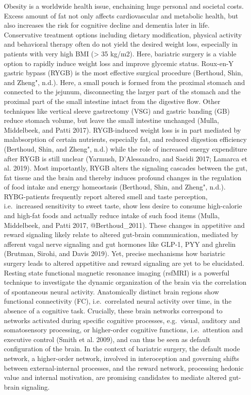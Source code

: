 \documentclass[
]{article}
\begin{document}
Obesity is a worldwide health issue, enchaining huge personal and societal costs. Excess amount of fat not only affects cardiovascular and metabolic health, but also increases the risk for cognitive decline and dementia later in life.
Conservative treatment options including dietary modification, physical activity and behavioral therapy often do not yield the desired weight loss, especially in patients with very high BMI (\textgreater{} 35 kg/m2). Here, bariatric surgery is a viable option to rapidly induce weight loss and improve glycemic status.
Roux-en-Y gastric bypass (RYGB) is the most effective surgical procedure (Berthoud, Shin, and Zheng", n.d.). Here, a small pouch is formed from the proximal stomach and connected to the jejunum, disconnecting the larger part of the stomach and the proximal part of the small intestine intact from the digestive flow. Other techniques like vertical sleeve gastrectomy (VSG) and gastric banding (GB) reduce stomach volume, but leave the small intestine unchanged (Mulla, Middelbeek, and Patti 2017).
RYGB-induced weight loss is in part mediated by malabsorption of certain nutrients, especially fat, and reduced digestion efficiency (Berthoud, Shin, and Zheng", n.d.) while the role of increased energy expenditure after RYGB is still unclear (Yarmush, D'Alessandro, and Saeidi 2017; Lamarca et al. 2019). Most importantly, RYGB alters the signaling cascades between the gut, fat tissue and the brain and thereby induces profound changes in the regulation of food intake and energy homeostasis (Berthoud, Shin, and Zheng", n.d.). RYBG-patients frequently report altered smell and taste perception, i.e.~increased sensitivity to sweet taste, show less desire to consume high-calorie and high-fat foods and actually reduce intake of such food items (Mulla, Middelbeek, and Patti 2017, @Berthoud\_2011). These changes in appetitive and reward signaling likely relate to altered gut-brain communication, mediated by afferent vagal nerve signaling and gut hormones like GLP-1, PYY and ghrelin (Brutman, Sirohi, and Davis 2019).
Yet, precise mechanisms how bariatric surgery leads to altered appetitive and reward signaling are yet to be elucidated.
Resting state functional magnetic resonance imaging (rsfMRI) is a powerful technique to investigate the dynamic organization of the brain via the correlation of spontaneous neural activity. Anatomically distinct brain regions show functional connectivity (FC), i.e.~correlated neural activity over time, in the absence of a cognitive task. Crucially, these brain networks correspond to networks activated during specific cognitive processes, e.g.~visual, auditory and somatosensory processing, or higher-order cognitive functions, i.e.~attention and executive control (Smith et al. 2009), and can thus be seen as default configuration of the brain. In the context of bariatric surgery, the default mode network, a higher-order network, involved in interoception and governing shifts between external-internal processes, and the reward network, processing hedonic value and internal motivation, are promising candidates to mediate altered gut-brain signaling.
\end{document}
